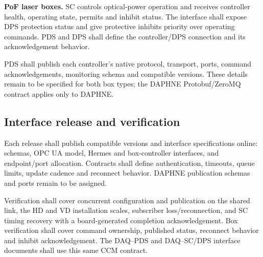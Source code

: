 \textbf{PoF laser boxes.} SC controls optical-power operation and receives
controller health, operating state, permits and inhibit status. The interface
shall expose DPS protection status and give protective inhibits priority over
operating commands. PDS and DPS shall define the controller/DPS connection and its
acknowledgement behavior.

PDS shall publish each controller's native protocol, transport, ports, command
acknowledgements, monitoring schema and compatible versions. These details
remain to be specified for both box types; the DAPHNE Protobuf/ZeroMQ contract
applies only to DAPHNE.

\clearpage
\subsection{Interface release and verification}

Each release shall publish compatible versions and interface specifications
online: schemas, OPC UA model, Hermes and box-controller interfaces, and
endpoint/port allocation. Contracts shall define authentication, timeouts,
queue limits, update cadence and reconnect behavior. DAPHNE publication
schemas and ports remain to be assigned.

Verification shall cover concurrent configuration and publication on the shared
link, the HD and VD installation scales, subscriber loss/reconnection, and SC
timing recovery with a board-generated completion acknowledgement. Box
verification shall cover command ownership, published status, reconnect
behavior and inhibit acknowledgement. The
DAQ--PDS and DAQ--SC/DPS interface documents shall use this same CCM contract.
